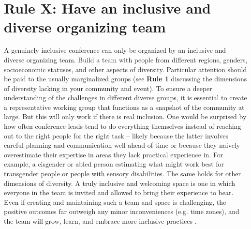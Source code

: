 \documentclass[10pt,letterpaper]{article}
\begin{document}
\section{Rule X: Have an inclusive and diverse organizing team}
\label{rule_organizing_team}
A genuinely inclusive conference can only be organized by an inclusive and diverse organizing team. Build a team with people from different regions, genders, socioeconomic statuses, and other aspects of diversity. Particular attention should be paid to the usually marginalized groups (see \textbf{Rule 1} discussing the dimensions of diversity lacking in your community and event). To ensure a deeper understanding of the challenges in different diverse groups, it is essential to create a representative working group that functions as a snapshot of the community at large. But this will only work if there is real inclusion. One would be surprised by how often conference leads tend to do everything themselves instead of reaching out to the right people for the right task -- likely because the latter involves careful planning and communication well ahead of time or because they naively overestimate their expertise in areas they lack practical experience in. For example, a cisgender or abled person estimating what might work best for transgender people or people with sensory disabilities. The same holds for other dimensions of diversity. A truly inclusive and welcoming space is one in which everyone in the team is invited and allowed to bring their experience to bear. Even if creating and maintaining such a team and space is challenging, the positive outcomes far outweigh any minor inconveniences (e.g. time zones), and the team will grow, learn, and embrace more inclusive practices \cite{hongGroupsDiverseProblem2004}. 


\end{document}
